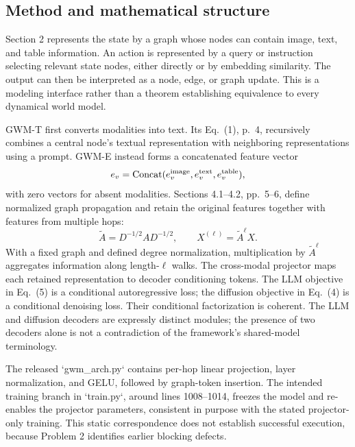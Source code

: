 \documentclass[10pt]{article}
\begin{document}
\subsection*{Method and mathematical structure}
Section 2 represents the state by a graph whose nodes can contain image, text, and table information. An action is represented by a query or instruction selecting relevant state nodes, either directly or by embedding similarity. The output can then be interpreted as a node, edge, or graph update. This is a modeling interface rather than a theorem establishing equivalence to every dynamical world model.\par
GWM-T first converts modalities into text. Its Eq. (1), p. 4, recursively combines a central node’s textual representation with neighboring representations using a prompt. GWM-E instead forms a concatenated feature vector \[e_v=\operatorname{Concat}(e_v^{\rm image},
                          e_v^{\rm text},
                          e_v^{\rm table}),\] with zero vectors for absent modalities. Sections 4.1–4.2, pp. 5–6, define normalized graph propagation and retain the original features together with features from multiple hops: \[\widetilde A=D^{-1/2}AD^{-1/2},\qquad
 X^{(\ell)}=\widetilde A^\ell X.\] With a fixed graph and defined degree normalization, multiplication by \(\widetilde A^\ell\) aggregates information along length-\(\ell\) walks. The cross-modal projector maps each retained representation to decoder conditioning tokens. The LLM objective in Eq. (5) is a conditional autoregressive loss; the diffusion objective in Eq. (4) is a conditional denoising loss. Their conditional factorization is coherent. The LLM and diffusion decoders are expressly distinct modules; the presence of two decoders alone is not a contradiction of the framework’s shared-model terminology.\par
The released `gwm\_arch.py` contains per-hop linear projection, layer normalization, and GELU, followed by graph-token insertion. The intended training branch in `train.py`, around lines 1008–1014, freezes the model and re-enables the projector parameters, consistent in purpose with the stated projector-only training. This static correspondence does not establish successful execution, because Problem 2 identifies earlier blocking defects.\par
\end{document}
